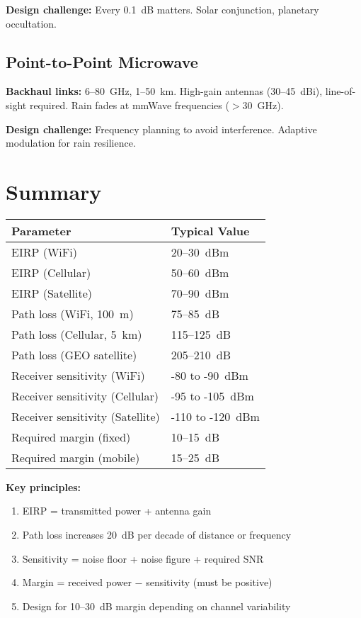 \textbf{Design challenge:} Every 0.1~dB matters. Solar conjunction, planetary occultation.

\subsection{Point-to-Point Microwave}

\textbf{Backhaul links:} 6--80~GHz, 1--50~km. High-gain antennas (30--45~dBi), line-of-sight required. Rain fades at mmWave frequencies ($>$30~GHz).

\textbf{Design challenge:} Frequency planning to avoid interference. Adaptive modulation for rain resilience.

\section{Summary}

\begin{center}
\begin{tabular}{@{}ll@{}}
\toprule
\textbf{Parameter} & \textbf{Typical Value} \\
\midrule
EIRP (WiFi) & 20--30~dBm \\
EIRP (Cellular) & 50--60~dBm \\
EIRP (Satellite) & 70--90~dBm \\
Path loss (WiFi, 100~m) & 75--85~dB \\
Path loss (Cellular, 5~km) & 115--125~dB \\
Path loss (GEO satellite) & 205--210~dB \\
Receiver sensitivity (WiFi) & -80 to -90~dBm \\
Receiver sensitivity (Cellular) & -95 to -105~dBm \\
Receiver sensitivity (Satellite) & -110 to -120~dBm \\
Required margin (fixed) & 10--15~dB \\
Required margin (mobile) & 15--25~dB \\
\bottomrule
\end{tabular}
\end{center}

\textbf{Key principles:}
\begin{enumerate}
\item EIRP = transmitted power + antenna gain
\item Path loss increases 20~dB per decade of distance or frequency
\item Sensitivity = noise floor + noise figure + required SNR
\item Margin = received power $-$ sensitivity (must be positive)
\item Design for 10--30~dB margin depending on channel variability
\end{enumerate}

